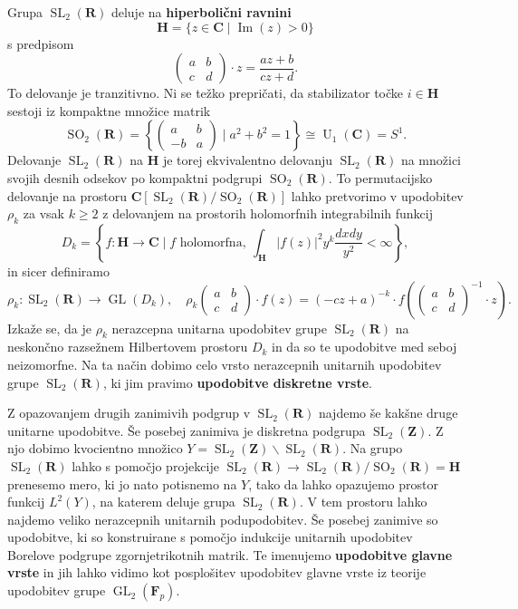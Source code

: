 \documentclass[11pt]{book}
\def\ZZ{\mathbf{Z}}
\def\RR{\mathbf{R}}
\def\CC{\mathbf{C}}
\def\FF{\mathbf{F}}
\def\HH{\mathbf{H}}
\DeclareMathOperator\GL{GL}
\DeclareMathOperator\U{U}
\DeclareMathOperator\SL{SL}
\DeclareMathOperator\SO{SO}
\DeclareMathOperator\imaginary{Im}
\def\definicija{\color{rdeca}\bf}
\theoremstyle{definition}
\theoremstyle{zgled}
\theoremstyle{zgledbrezstevilke}
\theoremstyle{odprtproblem}
\theoremstyle{domacanaloga}
\theoremstyle{izrek}
\begin{document}
Grupa $\SL_2(\RR)$ deluje na {\definicija hiperbolični ravnini}
\[
    \HH = \{  z \in \CC \mid \imaginary(z) > 0 \}
\]
s predpisom
\[
    \begin{pmatrix}
        a & b \\ c & d
    \end{pmatrix}
    \cdot z
    =
    \frac{az + b}{cz + d}.
\]
To delovanje je tranzitivno. Ni se težko prepričati, da stabilizator točke $i \in \HH$ sestoji iz kompaktne množice matrik
\[
    {\textstyle \SO_2(\RR)} = \left\{ \begin{pmatrix} a & b \\ -b & a \end{pmatrix} \mid a^2 + b^2 = 1 \right\}
    \cong \U_1(\CC) = S^1.
\]
Delovanje $\SL_2(\RR)$ na $\HH$ je torej ekvivalentno delovanju $\SL_2(\RR)$ na množici svojih desnih odsekov po kompaktni podgrupi $\SO_2(\RR)$. To permutacijsko delovanje na prostoru $\CC[\SL_2(\RR)/\SO_2(\RR)]$ lahko pretvorimo v upodobitev $\rho_k$ za vsak $k \geq 2$ z delovanjem na prostorih holomorfnih integrabilnih funkcij
\[
    D_k = \left\{ f \colon \HH \to \CC \mid \text{$f$ holomorfna}, \ \int_{\HH} |f(z)|^2 y^k \frac{dx dy}{y^2} < \infty \right\},
\]
in sicer definiramo
\[
    \rho_k \colon {\textstyle \SL_2(\RR)} \to \GL(D_k), \quad
    \rho_k \begin{pmatrix}
        a & b \\ c & d
    \end{pmatrix}
    \cdot f (z)
    = (-cz + a)^{-k} \cdot f\left( \begin{pmatrix}
        a & b \\ c & d
    \end{pmatrix}^{-1} \cdot z \right).
\]
Izkaže se, da je $\rho_k$ nerazcepna unitarna upodobitev grupe $\SL_2(\RR)$ na neskončno razsežnem Hilbertovem prostoru $D_k$ in da so te upodobitve med seboj neizomorfne. Na ta način dobimo celo vrsto nerazcepnih unitarnih upodobitev grupe $\SL_2(\RR)$, ki jim pravimo {\definicija upodobitve diskretne vrste}.

Z opazovanjem drugih zanimivih podgrup v $\SL_2(\RR)$ najdemo še kakšne druge unitarne upodobitve. Še posebej zanimiva je diskretna podgrupa $\SL_2(\ZZ)$. Z njo dobimo kvocientno množico $Y = \SL_2(\ZZ) \backslash \SL_2(\RR)$. Na grupo $\SL_2(\RR)$ lahko s pomočjo projekcije $\SL_2(\RR) \to \SL_2(\RR)/\SO_2(\RR) = \HH$ prenesemo mero, ki jo nato potisnemo na $Y$, tako da lahko opazujemo prostor funkcij $L^2(Y)$, na katerem deluje grupa $\SL_2(\RR)$. V tem prostoru lahko najdemo veliko nerazcepnih unitarnih podupodobitev. Še posebej zanimive so upodobitve, ki so konstruirane s pomočjo indukcije unitarnih upodobitev Borelove podgrupe zgornjetrikotnih matrik. Te imenujemo {\definicija upodobitve glavne vrste} in jih lahko vidimo kot posplošitev upodobitev glavne vrste iz teorije upodobitev grupe $\GL_2(\FF_p)$.
\end{document}

